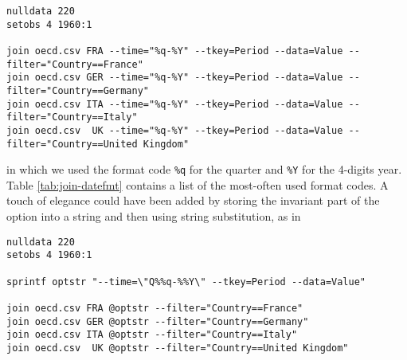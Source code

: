 \begin{footnotesize}
\begin{verbatim}
nulldata 220
setobs 4 1960:1

join oecd.csv FRA --time="%q-%Y" --tkey=Period --data=Value --filter="Country==France"
join oecd.csv GER --time="%q-%Y" --tkey=Period --data=Value --filter="Country==Germany"
join oecd.csv ITA --time="%q-%Y" --tkey=Period --data=Value --filter="Country==Italy"
join oecd.csv  UK --time="%q-%Y" --tkey=Period --data=Value --filter="Country==United Kingdom"
\end{verbatim}
\end{footnotesize}

in which we used the format code \verb|%q| for the quarter and
\verb|%Y| for the 4-digits year. Table \ref{tab:join-datefmt} contains
a list of the most-often used format codes. A touch of elegance could
have been added by storing the invariant part of the  option
into a string and then using string substitution, as in

\begin{footnotesize}
\begin{verbatim}
nulldata 220
setobs 4 1960:1

sprintf optstr "--time=\"Q%%q-%%Y\" --tkey=Period --data=Value"

join oecd.csv FRA @optstr --filter="Country==France"
join oecd.csv GER @optstr --filter="Country==Germany"
join oecd.csv ITA @optstr --filter="Country==Italy"
join oecd.csv  UK @optstr --filter="Country==United Kingdom"
\end{verbatim}
\end{footnotesize}



